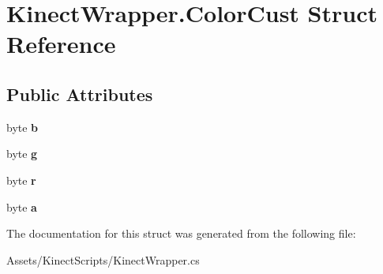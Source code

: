 \hypertarget{struct_kinect_wrapper_1_1_color_cust}{}\section{Kinect\+Wrapper.\+Color\+Cust Struct Reference}
\label{struct_kinect_wrapper_1_1_color_cust}
\subsection*{Public Attributes}
\begin{DoxyCompactItemize}
\item 
\mbox{\label{struct_kinect_wrapper_1_1_color_cust_aff71e744cf6de415836b84af52d3025f}} 
byte {\bfseries b}
\item 
\mbox{\label{struct_kinect_wrapper_1_1_color_cust_abe8b552fcc9ad59a6d8565d14499e898}} 
byte {\bfseries g}
\item 
\mbox{\label{struct_kinect_wrapper_1_1_color_cust_a398cec0bca93e27ba4335267df2a0cda}} 
byte {\bfseries r}
\item 
\mbox{\label{struct_kinect_wrapper_1_1_color_cust_a662e6b987c8d9d7971faaa131f165aa0}} 
byte {\bfseries a}
\end{DoxyCompactItemize}


The documentation for this struct was generated from the following file\+:\begin{DoxyCompactItemize}
\item 
Assets/\+Kinect\+Scripts/Kinect\+Wrapper.\+cs\end{DoxyCompactItemize}
